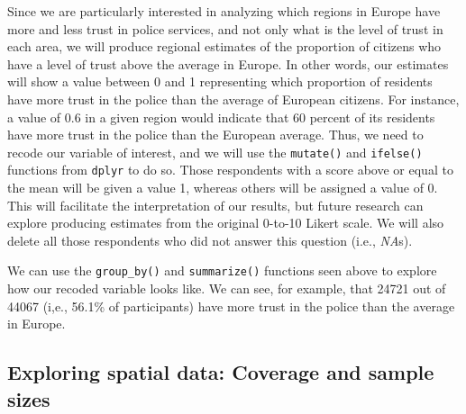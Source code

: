 \documentclass[
]{article}
\newenvironment{Shaded}{\begin{snugshade}}{\end{snugshade}}
\newcommand{\CommentTok}[1]{\textcolor[rgb]{0.56,0.35,0.01}{\textit{#1}}}
\newcommand{\DataTypeTok}[1]{\textcolor[rgb]{0.13,0.29,0.53}{#1}}
\newcommand{\DecValTok}[1]{\textcolor[rgb]{0.00,0.00,0.81}{#1}}
\newcommand{\KeywordTok}[1]{\textcolor[rgb]{0.13,0.29,0.53}{\textbf{#1}}}
\newcommand{\NormalTok}[1]{#1}
\newcommand{\OperatorTok}[1]{\textcolor[rgb]{0.81,0.36,0.00}{\textbf{#1}}}
\newcommand{\StringTok}[1]{\textcolor[rgb]{0.31,0.60,0.02}{#1}}
\begin{document}
Since we are particularly interested in analyzing which regions in
Europe have more and less trust in police services, and not only what is
the level of trust in each area, we will produce regional estimates of
the proportion of citizens who have a level of trust above the average
in Europe. In other words, our estimates will show a value between 0 and
1 representing which proportion of residents have more trust in the
police than the average of European citizens. For instance, a value of
0.6 in a given region would indicate that 60 percent of its residents
have more trust in the police than the European average. Thus, we need
to recode our variable of interest, and we will use the
\texttt{mutate()} and \texttt{ifelse()} functions from \texttt{dplyr} to
do so. Those respondents with a score above or equal to the mean will be
given a value 1, whereas others will be assigned a value of 0. This will
facilitate the interpretation of our results, but future research can
explore producing estimates from the original 0-to-10 Likert scale. We
will also delete all those respondents who did not answer this question
(i.e., \emph{NA}s).

\begin{Shaded}
\end{Shaded}

We can use the \texttt{group\_by()} and \texttt{summarize()} functions
seen above to explore how our recoded variable looks like. We can see,
for example, that 24721 out of 44067 (i,e., 56.1\% of participants) have
more trust in the police than the average in Europe.

\hypertarget{exploring-spatial-data-coverage-and-sample-sizes}{%
\subsection{Exploring spatial data: Coverage and sample
sizes}\label{exploring-spatial-data-coverage-and-sample-sizes}}
\end{document}
